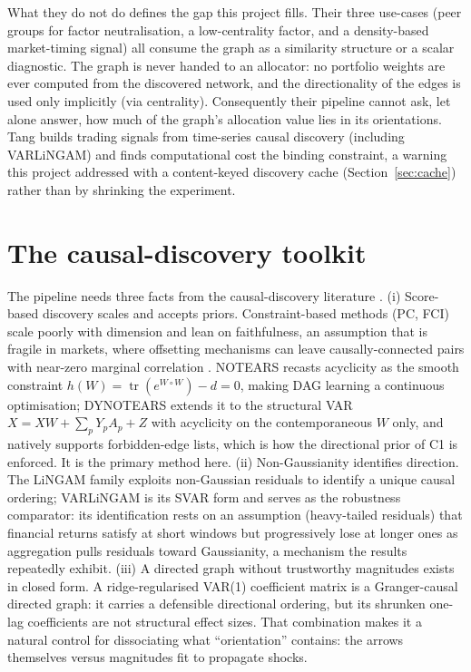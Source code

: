 What they do not do defines the gap this project fills. Their three
use-cases (peer groups for factor neutralisation, a low-centrality factor,
and a density-based market-timing signal) all consume the graph as a
similarity structure or a scalar diagnostic. The graph is never handed to an
allocator: no portfolio weights are ever computed from the discovered
network, and the directionality of the edges is used only implicitly (via
centrality). Consequently their pipeline cannot ask, let alone answer, how
much of the graph's allocation value lies in its orientations. Tang
\cite{tang2024trading} builds trading signals from time-series causal
discovery (including VARLiNGAM) and finds computational cost the binding
constraint, a warning this project addressed with a content-keyed discovery
cache (Section~\ref{sec:cache}) rather than by shrinking the experiment.

\section{The causal-discovery toolkit}
\label{sec:cd-tools}

The pipeline needs three facts from the causal-discovery literature
\cite{spirtes2000causation,kaddour2022causalml}. (i) Score-based
discovery scales and accepts priors. Constraint-based methods (PC, FCI)
scale poorly with dimension and lean on faithfulness, an assumption that is
fragile in markets,
where offsetting mechanisms can leave causally-connected pairs with near-zero
marginal correlation \cite{howard2025causal}. NOTEARS \cite{zheng2018notears}
recasts acyclicity as the smooth constraint
$h(W)=\operatorname{tr}(e^{W\circ W})-d=0$, making DAG learning a continuous
optimisation; DYNOTEARS \cite{pamfil2020dynotears} extends it to the
structural VAR $X = XW + \sum_p Y_p A_p + Z$ with acyclicity on the
contemporaneous $W$ only, and natively supports forbidden-edge lists, which
is how the directional prior of C1 is enforced. It is the primary method
here.
(ii) Non-Gaussianity identifies direction. The LiNGAM family
\cite{shimizu2006lingam} exploits non-Gaussian residuals to identify a unique
causal ordering; VARLiNGAM \cite{hyvarinen2010varlingam} is its SVAR form and
serves as the robustness comparator: its identification rests on an
assumption (heavy-tailed residuals) that financial returns satisfy at short
windows but progressively lose at longer ones as aggregation pulls residuals
toward Gaussianity, a mechanism the results repeatedly exhibit.
(iii) A directed graph without trustworthy magnitudes exists in
closed form. A ridge-regularised VAR(1) coefficient matrix is a
Granger-causal \cite{granger1969investigating} directed graph: it carries a
defensible directional ordering, but its shrunken one-lag
coefficients are not structural effect sizes. That combination makes it a
natural control for dissociating what ``orientation'' contains: the
arrows themselves versus magnitudes fit to propagate shocks.

